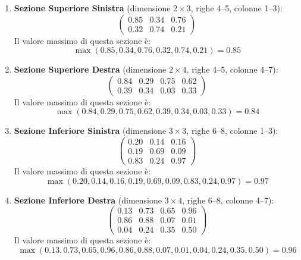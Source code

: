﻿\documentclass[11pt, a4paper]{article}
\begin{document}
\begin{enumerate}
    \item \textbf{Sezione Superiore Sinistra} (dimensione $2 \times 3$, righe 4--5, colonne 1--3):
    \[
    \begin{pmatrix}
    0.85 & 0.34 & 0.76 \\
    0.32 & 0.74 & 0.21
    \end{pmatrix}
    \]
    Il valore massimo di questa sezione è:
    \[
    \max(0.85, 0.34, 0.76, 0.32, 0.74, 0.21) = \boxed{0.85}
    \]

    \item \textbf{Sezione Superiore Destra} (dimensione $2 \times 4$, righe 4--5, colonne 4--7):
    \[
    \begin{pmatrix}
    0.84 & 0.29 & 0.75 & 0.62 \\
    0.39 & 0.34 & 0.03 & 0.33
    \end{pmatrix}
    \]
    Il valore massimo di questa sezione è:
    \[
    \max(0.84, 0.29, 0.75, 0.62, 0.39, 0.34, 0.03, 0.33) = \boxed{0.84}
    \]

    \item \textbf{Sezione Inferiore Sinistra} (dimensione $3 \times 3$, righe 6--8, colonne 1--3):
    \[
    \begin{pmatrix}
    0.20 & 0.14 & 0.16 \\
    0.19 & 0.69 & 0.09 \\
    0.83 & 0.24 & 0.97
    \end{pmatrix}
    \]
    Il valore massimo di questa sezione è:
    \[
    \max(0.20, 0.14, 0.16, 0.19, 0.69, 0.09, 0.83, 0.24, 0.97) = \boxed{0.97}
    \]

    \item \textbf{Sezione Inferiore Destra} (dimensione $3 \times 4$, righe 6--8, colonne 4--7):
    \[
    \begin{pmatrix}
    0.13 & 0.73 & 0.65 & 0.96 \\
    0.86 & 0.88 & 0.07 & 0.01 \\
    0.04 & 0.24 & 0.35 & 0.50
    \end{pmatrix}
    \]
    Il valore massimo di questa sezione è:
    \[
    \max(0.13, 0.73, 0.65, 0.96, 0.86, 0.88, 0.07, 0.01, 0.04, 0.24, 0.35, 0.50) = \boxed{0.96}
    \]
\end{enumerate}

\end{document}
